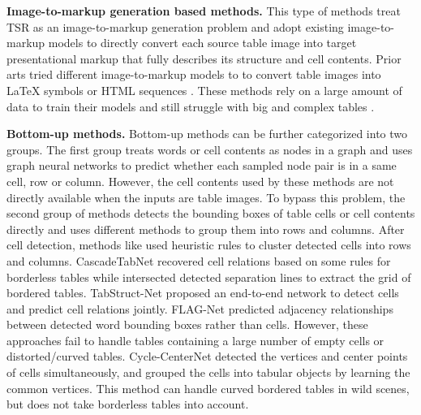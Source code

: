 \documentclass[sigconf]{acmart}
\begin{document}
\textbf{Image-to-markup generation based methods.} This type of methods treat TSR as an image-to-markup generation problem and adopt existing image-to-markup models to directly convert each source table image into target presentational markup that fully describes its structure and cell contents. Prior arts tried different image-to-markup models to to convert table images into LaTeX symbols \cite{deng2019challenges,he2021pingan} or HTML sequences \cite{li2020tablebank, zhong2020image}. These methods rely on a large amount of data to train their models and still struggle with big and complex tables \cite{li2020tablebank,zhong2020image}.

\textbf{Bottom-up methods.} Bottom-up methods can be further categorized into two groups. The first group \cite{rethinkinggnn2019,chi2019complicated,li2021gfte,xue2019res2tim} treats words or cell contents as nodes in a graph and uses graph neural networks to predict whether each sampled node pair is in a same cell, row or column. However, the cell contents used by these methods are not directly available when the inputs are table images. To bypass this problem, the second group of methods \cite{GTE2021,prasad2020cascadetabnet,TabStruct2020,li2021adaptive,Qiao2021LGPMACT,FLAG2021} detects the bounding boxes of table cells or cell contents directly and uses different methods to group them into rows and columns. After cell detection, methods like \cite{GTE2021,li2021adaptive,Qiao2021LGPMACT} used heuristic rules to cluster detected cells into rows and columns. CascadeTabNet \cite{prasad2020cascadetabnet} recovered cell relations based on some rules for borderless tables while intersected detected separation lines to extract the grid of bordered tables. TabStruct-Net \cite{TabStruct2020} proposed an end-to-end network to detect cells and predict cell relations jointly. FLAG-Net \cite{FLAG2021} predicted adjacency relationships between detected word bounding boxes rather than cells. However, these approaches fail to handle tables containing a large number of empty cells or distorted/curved tables. Cycle-CenterNet \cite{long2021parsing} detected the vertices and center points of cells simultaneously, and grouped the cells into tabular objects by learning the common vertices. This method can handle curved bordered tables in wild scenes, but does not take borderless tables into account.
\end{document}
